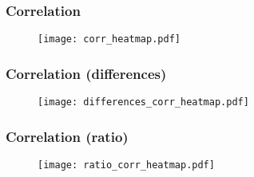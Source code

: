 \begin{frame}
    \frametitle{Correlation}

    \vspace{-15pt}
    \begin{figure}
    \texttt{[image: corr\_heatmap.pdf]}
    \end{figure}
\end{frame}

\begin{frame}
    \frametitle{Correlation (differences)}

    \vspace{-15pt}
    \begin{figure}
    \texttt{[image: differences\_corr\_heatmap.pdf]}
    \end{figure}
\end{frame}

\begin{frame}
    \frametitle{Correlation (ratio)}

    \vspace{-15pt}
    \begin{figure}
    \texttt{[image: ratio\_corr\_heatmap.pdf]}
    \end{figure}
\end{frame}
